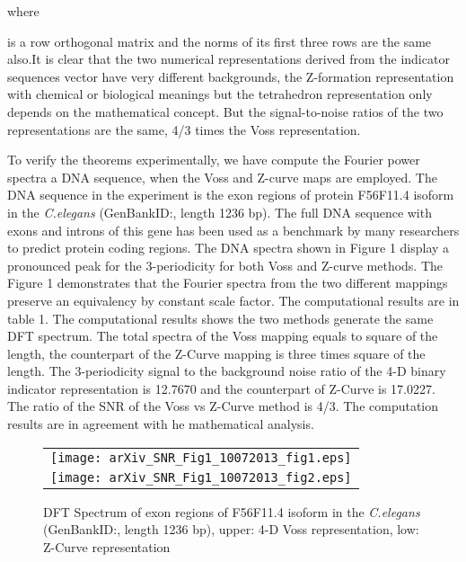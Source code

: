\documentclass[preprint,authoryear,12pt]{elsarticle}
\begin{document}
where

is a row orthogonal matrix and the norms of its first three rows are the same also.It is clear that the two numerical representations derived from the indicator sequences vector have very different backgrounds, the Z-formation representation with chemical or biological meanings but the tetrahedron representation \citep{SILVERMAN1986} only depends on the mathematical concept. But the signal-to-noise ratios of the two representations are the same, 4/3 times the Voss representation.

To verify the theorems experimentally, we have compute the Fourier power spectra a DNA sequence, when the Voss and Z-curve maps are employed. The DNA sequence in the experiment is the exon regions of protein F56F11.4 isoform in the \emph{C.elegans} (GenBankID:, length 1236 bp). The full DNA sequence with exons and introns of this gene has been used as a benchmark by many researchers to predict protein coding regions\citep{anastassiou2001genomic,yin2007prediction,jiang2008coding}. The DNA spectra shown in Figure 1 display a pronounced peak for the 3-periodicity for both Voss and Z-curve methods. The Figure 1 demonstrates that the Fourier spectra from the two different mappings preserve an equivalency by constant scale factor. The computational results are in table 1. The computational results shows the two methods generate the same DFT spectrum. The total spectra of the Voss mapping equals to square of the length, the counterpart of the Z-Curve mapping is three times square of the length. The 3-periodicity signal to the background noise ratio of the 4-D binary indicator representation is 12.7670 and the counterpart of Z-Curve is 17.0227. The ratio of the SNR of the Voss vs Z-Curve method is 4/3. The computation results are in agreement with he mathematical analysis.\\
\begin{figure}
\centering
\begin{tabular}{c}
\texttt{[image: arXiv\_SNR\_Fig1\_10072013\_fig1.eps]} \\
\texttt{[image: arXiv\_SNR\_Fig1\_10072013\_fig2.eps]} \\
\end{tabular}
\caption{DFT Spectrum of exon regions of F56F11.4 isoform in the \emph{C.elegans} (GenBankID:, length 1236 bp), upper: 4-D Voss representation, low: Z-Curve representation}
\end{figure}
\end{document}

